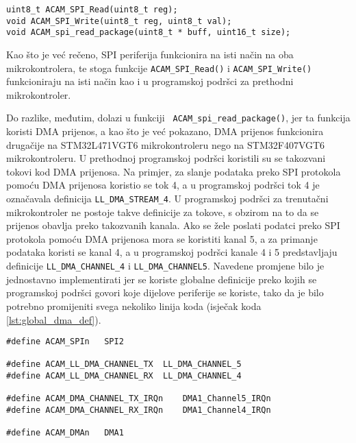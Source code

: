 \begin{lstlisting}[caption=Funkcije za rad s SPI periferijom, label={lst:acam_spi_functions}]
uint8_t ACAM_SPI_Read(uint8_t reg);
void ACAM_SPI_Write(uint8_t reg, uint8_t val);
void ACAM_spi_read_package(uint8_t * buff, uint16_t size);
\end{lstlisting}

\noindent Kao što je već rečeno, SPI periferija funkcionira na isti način na oba mikrokontrolera, te stoga funkcije \verb|ACAM_SPI_Read()| i \verb|ACAM_SPI_Write()| funkcioniraju na isti način kao i u programskoj podršci za prethodni mikrokontroler.

Do razlike, međutim, dolazi u funkciji \verb| ACAM_spi_read_package()|, jer ta funkcija koristi DMA prijenos, a kao što je već pokazano, DMA prijenos funkcionira drugačije na STM32L471VGT6 mikrokontroleru nego na STM32F407VGT6 mikrokontroleru. U prethodnoj programskoj podršci koristili su se takozvani tokovi kod DMA prijenosa. Na primjer, za slanje podataka preko SPI protokola pomoću DMA prijenosa koristio se tok 4, a u programskoj podršci tok 4 je označavala definicija \verb|LL_DMA_STREAM_4|. U programskoj podršci za trenutačni mikrokontroler ne postoje takve definicije za tokove, s obzirom na to da se prijenos obavlja preko takozvanih kanala. Ako se žele poslati podatci preko SPI protokola pomoću DMA prijenosa mora se koristiti kanal 5, a za primanje podataka koristi se kanal 4, a u programskoj podršci kanale 4 i 5 predstavljaju definicije \verb|LL_DMA_CHANNEL_4| i \verb|LL_DMA_CHANNEL5|. Navedene promjene bilo je jednostavno implementirati jer se koriste globalne definicije preko kojih se programskoj podršci govori koje dijelove periferije se koriste, tako da je bilo potrebno promijeniti svega nekoliko linija koda (isječak koda \ref{lst:global_dma_def}).
\begin{lstlisting}[caption=Zaglavlje \texttt{dma.h} datoteke u kojima se definira koji dijelovi periferija se koriste, label={lst:global_dma_def}]
#define ACAM_SPIn	SPI2

#define ACAM_LL_DMA_CHANNEL_TX	LL_DMA_CHANNEL_5
#define ACAM_LL_DMA_CHANNEL_RX	LL_DMA_CHANNEL_4

#define ACAM_DMA_CHANNEL_TX_IRQn	DMA1_Channel5_IRQn
#define ACAM_DMA_CHANNEL_RX_IRQn	DMA1_Channel4_IRQn

#define ACAM_DMAn	DMA1
\end{lstlisting}


